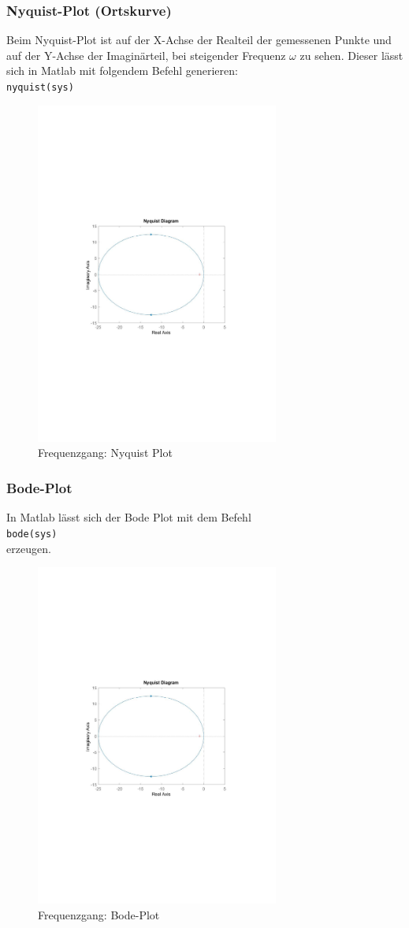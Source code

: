 \subsubsection{Nyquist-Plot (Ortskurve)}
Beim Nyquist-Plot ist auf der X-Achse der Realteil der gemessenen Punkte
und auf der Y-Achse der Imaginärteil, bei steigender Frequenz $\omega$ zu sehen.
Dieser lässt sich in Matlab mit folgendem Befehl generieren:\\
\texttt{nyquist(sys)}
\begin{figure}[H]
    \centering
    \includegraphics[width=8cm]{image/NyquistPlot.pdf}
    \caption{Frequenzgang: Nyquist Plot}
\end{figure}
\subsubsection{Bode-Plot}
In Matlab lässt sich der Bode Plot mit dem Befehl\\
\texttt{bode(sys)}\\
erzeugen.
\begin{figure}[H]
    \centering
    \includegraphics[width=8cm]{image/NyquistPlot.pdf}
    \caption{Frequenzgang: Bode-Plot}
\end{figure}